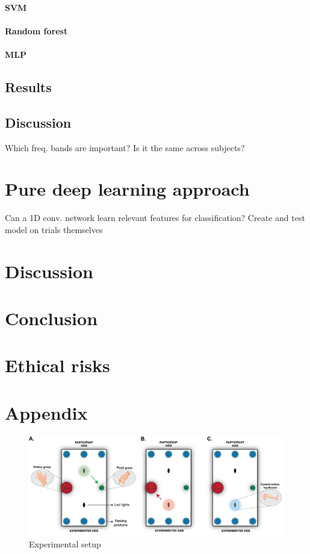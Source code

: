 \documentclass[10pt,conference,compsocconf]{IEEEtran}
\begin{document}
\paragraph{SVM}
\paragraph{Random forest}
\paragraph{MLP}

\subsection{Results}
\subsection{Discussion}
Which freq. bands are important? Is it the same across subjects?

\section{Pure deep learning approach}
\label{sec:deeplearning}
Can a 1D conv. network learn relevant features for classification? Create and test model on trials themselves

\section{Discussion}
\label{sec:discussion}

\section{Conclusion}
\label{sec:conclusion}


\section{Ethical risks}




\section{Appendix}

\begin{figure}[h!]
    \center
    \includegraphics[width=\linewidth]{images/2024-12-11-13-41-23.png}
    \caption{Experimental setup}
\end{figure}
\FloatBarrier
\end{document}
